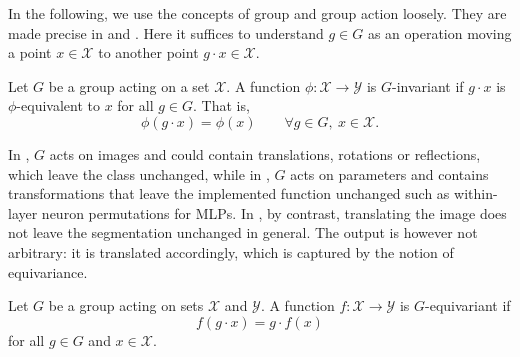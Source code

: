 \documentclass[mathematics,review,submit,moreauthors]{Definitions/mdpi}
\begin{document}
In the following, we use the concepts of group and group action loosely.
They are made precise in  and .
Here it suffices to understand $g\in G$ as an operation moving a point $x\in\mathcal{X}$ to another point $g\cdot x\in\mathcal{X}$.

\begin{Definition}[Invariance]\label{def:invariance}
    Let $G$ be a group acting on a set $\mathcal{X}$.
    A function $\phi : \mathcal{X} \to \mathcal{Y}$ is $G$-invariant if $g\cdot x$ is $\phi$-equivalent to $x$ for all $g\in G$.
    That is, 
    \[
        \phi(g\cdot x)=\phi(x)\qquad\forall g\in G,\ x\in\mathcal{X}.
    \]
\end{Definition}

In , $G$ acts on images and could contain translations, rotations or reflections, which leave the class unchanged, while in , $G$ acts on parameters and contains transformations that leave the implemented function unchanged such as within-layer neuron permutations for MLPs.
In , by contrast, translating the image does not leave the segmentation unchanged in general.
The output is however not arbitrary: it is translated accordingly, which is captured by the notion of equivariance.

\begin{Definition}[Equivariance]\label{def:equivariance}
    Let $G$ be a group acting on sets $\mathcal{X}$ and $\mathcal{Y}$. 
    A function $f : \mathcal{X} \to \mathcal{Y}$ is $G$-equivariant if
    \[
        f(g \cdot x) = g \cdot f(x)
    \]
    for all $g \in G$ and $x \in \mathcal{X}$.
\end{Definition}
\end{document}
